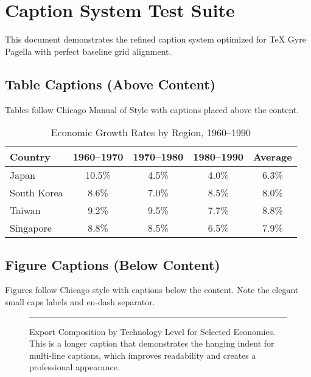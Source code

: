 \documentclass[11pt,a4paper]{article}
\begin{document}
\showgrid

\section{Caption System Test Suite}

This document demonstrates the refined caption system optimized for TeX Gyre Pagella with perfect baseline grid alignment.

\subsection{Table Captions (Above Content)}

Tables follow Chicago Manual of Style with captions placed above the content.

\begin{table}[tbp]
  \caption{Economic Growth Rates by Region, 1960–1990}
  \label{tab:growth-rates}
  \centering
  \begin{tabular}{@{}lcccc@{}}
    \toprule
    Country & 1960–1970 & 1970–1980 & 1980–1990 & Average \\
    \midrule
    Japan & 10.5\% & 4.5\% & 4.0\% & 6.3\% \\
    South Korea & 8.6\% & 7.0\% & 8.5\% & 8.0\% \\
    Taiwan & 9.2\% & 9.5\% & 7.7\% & 8.8\% \\
    Singapore & 8.8\% & 8.5\% & 6.5\% & 7.9\% \\
    \bottomrule
  \end{tabular}
\end{table}

\subsection{Figure Captions (Below Content)}

Figures follow Chicago style with captions below the content. Note the elegant small caps labels and en-dash separator.

\begin{figure}[tbp]
  \centering
  \rule{0.8\textwidth}{0.4\textwidth}%
  \caption{Export Composition by Technology Level for Selected Economies. This is a longer caption that demonstrates the hanging indent for multi-line captions, which improves readability and creates a professional appearance.}
  \label{fig:export-comp}
\end{figure}
\end{document}
